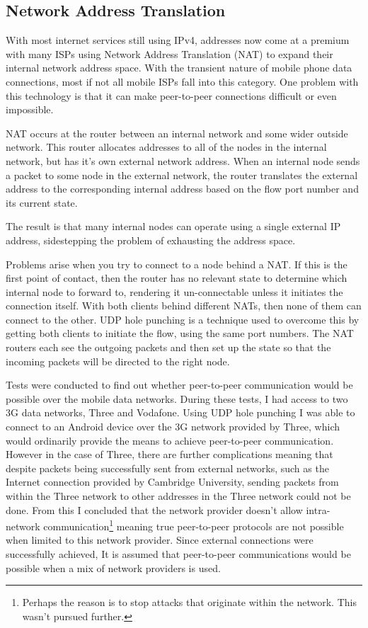 \subsection{Network Address Translation}
\label{nat}

With most internet services still using IPv4, addresses now come at a premium with many ISPs using Network Address Translation (NAT) to expand their internal network address space. With the transient nature of mobile phone data connections, most if not all mobile ISPs fall into this category. One problem with this technology is that it can make peer-to-peer connections difficult or even impossible.

NAT occurs at the router between an internal network and some wider outside network. This router allocates addresses to all of the nodes in the internal network, but has it's own external network address. When an internal node sends a packet to some node in the external network, the router translates the external address to the corresponding internal address based on the flow port number and its current state.

The result is that many internal nodes can operate using a single external IP address, sidestepping the problem of exhausting the address space.

Problems arise when you try to connect to a node behind a NAT. If this is the first point of contact, then the router has no relevant state to determine which internal node to forward to, rendering it un-connectable unless it initiates the connection itself. With both clients behind different NATs, then none of them can connect to the other. UDP hole punching is a technique used to overcome this by getting both clients to initiate the flow, using the same port numbers. The NAT routers each see the outgoing packets and then set up the state so that the incoming packets will be directed to the right node.

Tests were conducted to find out whether peer-to-peer communication would be possible over the mobile data networks. During these tests, I had access to two 3G data networks, Three and Vodafone.
Using UDP hole punching I was able to connect to an Android device over the 3G network provided by Three, which would ordinarily provide the means to achieve peer-to-peer communication. However in the case of Three, there are further complications meaning that despite packets being successfully sent from external networks, such as the Internet connection provided by Cambridge University, sending packets from within the Three network to other addresses in the Three network could not be done. From this I concluded that the network provider doesn't allow intra-network communication\footnote{Perhaps the reason is to stop attacks that originate within the network. This wasn't pursued further.} meaning true peer-to-peer protocols are not possible when limited to this network provider. Since external connections were successfully achieved, It is assumed that peer-to-peer communications would be possible when a mix of network providers is used.

